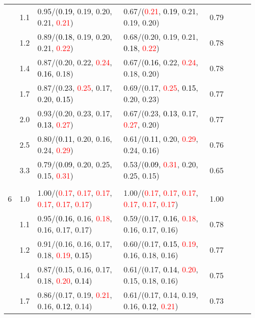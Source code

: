 \documentclass[10pt,a4paper]{report}
\begin{document}
\begin{table}[!htbp]
\begin{center}
{\begin{tabular}{ccllcccc}
			&1.1&0.95/(\textcolor{black}{0.19}, 0.19, 0.20, 0.21, \textcolor{red}{0.21})&0.67/(\textcolor{red}{0.21}, \textcolor{black}{0.19}, 0.21, 0.19, 0.20)&0.79\\
			&1.2&0.89/(\textcolor{black}{0.18}, 0.19, 0.20, 0.21, \textcolor{red}{0.22})&0.68/(0.20, 0.19, 0.21, \textcolor{black}{0.18}, \textcolor{red}{0.22})&0.78\\
			&1.4&0.87/(0.20, 0.22, \textcolor{red}{0.24}, \textcolor{black}{0.16}, 0.18)&0.67/(\textcolor{black}{0.16}, 0.22, \textcolor{red}{0.24}, 0.18, 0.20)&0.78\\
			&1.7&0.87/(0.23, \textcolor{red}{0.25}, 0.17, 0.20, \textcolor{black}{0.15})&0.69/(0.17, \textcolor{red}{0.25}, \textcolor{black}{0.15}, 0.20, 0.23)&0.77\\
			&2.0&0.93/(0.20, 0.23, 0.17, \textcolor{black}{0.13}, \textcolor{red}{0.27})&0.67/(0.23, \textcolor{black}{0.13}, 0.17, \textcolor{red}{0.27}, 0.20)&0.77\\
			&2.5&0.80/(\textcolor{black}{0.11}, 0.20, 0.16, 0.24, \textcolor{red}{0.29})&0.61/(\textcolor{black}{0.11}, 0.20, \textcolor{red}{0.29}, 0.24, 0.16)&0.76\\
			&3.3&0.79/(\textcolor{black}{0.09}, 0.20, 0.25, 0.15, \textcolor{red}{0.31})&0.53/(\textcolor{black}{0.09}, \textcolor{red}{0.31}, 0.20, 0.25, 0.15)&0.65\\
			&&&&\\
			6			&1.0&1.00/(\textcolor{red}{0.17}, \textcolor{red}{0.17}, \textcolor{red}{0.17}, \textcolor{red}{0.17}, \textcolor{red}{0.17}, \textcolor{red}{0.17})&1.00/(\textcolor{red}{0.17}, \textcolor{red}{0.17}, \textcolor{red}{0.17}, \textcolor{red}{0.17}, \textcolor{red}{0.17}, \textcolor{red}{0.17})&1.00\\
			&1.1&0.95/(\textcolor{black}{0.16}, 0.16, \textcolor{red}{0.18}, 0.16, 0.17, 0.17)&0.59/(0.17, \textcolor{black}{0.16}, \textcolor{red}{0.18}, 0.16, 0.17, 0.16)&0.78\\
			&1.2&0.91/(0.16, 0.16, 0.17, 0.18, \textcolor{red}{0.19}, \textcolor{black}{0.15})&0.60/(0.17, \textcolor{black}{0.15}, \textcolor{red}{0.19}, 0.16, 0.18, 0.16)&0.77\\
			&1.4&0.87/(0.15, 0.16, 0.17, 0.18, \textcolor{red}{0.20}, \textcolor{black}{0.14})&0.61/(0.17, \textcolor{black}{0.14}, \textcolor{red}{0.20}, 0.15, 0.18, 0.16)&0.75\\
			&1.7&0.86/(0.17, 0.19, \textcolor{red}{0.21}, 0.16, \textcolor{black}{0.12}, 0.14)&0.61/(0.17, 0.14, 0.19, 0.16, \textcolor{black}{0.12}, \textcolor{red}{0.21})&0.73\\

\end{tabular}}
\end{center}
\end{table}
\end{document}

